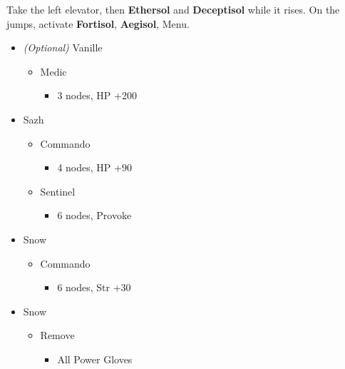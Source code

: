 	Take the left elevator, then \textbf{Ethersol} and \textbf{Deceptisol} while it rises. On the jumps, activate \textbf{Fortisol}, \textbf{Aegisol}, Menu.
	\begin{menu}
		\begin{itemize}
			\crystarium
			\begin{itemize}
				\item \textit{(Optional)} Vanille
				      \begin{itemize}
					      \item Medic
					            \begin{itemize}
						            \item 3 nodes, HP +200
					            \end{itemize}
				      \end{itemize}
				\item Sazh
				      \begin{itemize}
					      \item Commando
					            \begin{itemize}
						            \item 4 nodes, HP +90
					            \end{itemize}
					      \item Sentinel
					            \begin{itemize}
						            \item 6 nodes, Provoke
					            \end{itemize}
				      \end{itemize}
				\item Snow
				      \begin{itemize}
					      \item Commando
					            \begin{itemize}
						            \item 6 nodes, Str +30
					            \end{itemize}
				      \end{itemize}
			\end{itemize}
			\equip
			\begin{itemize}
				\item Snow
				      \begin{itemize}
					      \item Remove
					            \begin{itemize}
						            \item All Power Gloves
					            \end{itemize}

\end{itemize}
\end{itemize}
\end{itemize}
\end{menu}
